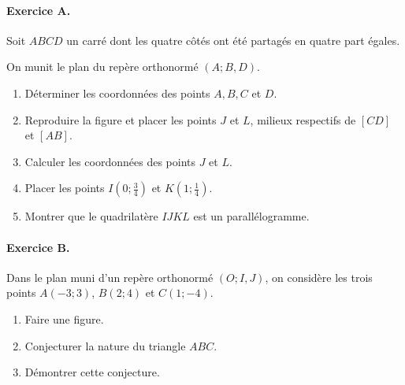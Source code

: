 \documentclass[11pt]{article}
\begin{document}
\paragraph{Exercice A.} Soit $ABCD$ un carré dont les quatre côtés ont été
partagés en quatre part égales.
\begin{minipage}{.7\textwidth}
On munit le plan du repère orthonormé $(A; B, D)$.
\begin{enumerate}
  \item Déterminer les coordonnées des points $A, B, C$ et $D$.
  \item Reproduire la figure et placer les points $J$ et $L$, milieux respectifs
    de $\left[ CD \right]$ et $\left[ AB \right]$.
  \item Calculer les coordonnées des points $J$ et $L$.
  \item Placer les points $I(0; \frac{3}{4})$ et $K(1; \frac{1}{4})$.
  \item Montrer que le quadrilatère $IJKL$ est un parallélogramme.
\end{enumerate}
\end{minipage}
\begin{minipage}{.3\textwidth}
  \begin{center}
  \end{center}
\end{minipage}

\paragraph{Exercice B.} Dans le plan muni d'un repère orthonormé $(O; I, J)$, on
considère les trois points $A(-3; 3)$, $B(2; 4)$ et $C(1; -4)$.
\begin{enumerate}
  \item Faire une figure.
  \item Conjecturer la nature du triangle $ABC$.
  \item Démontrer cette conjecture.
\end{enumerate}
\end{document}
